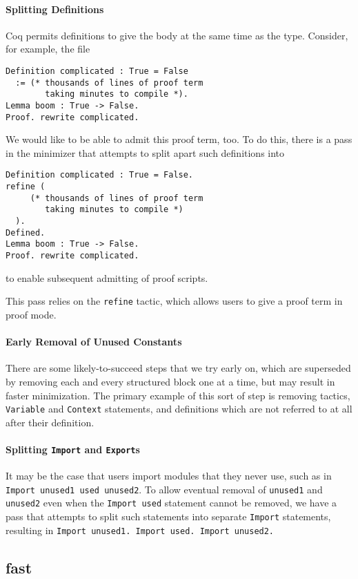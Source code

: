 \documentclass[a4paper,USenglish,cleveref,autoref,thm-restate]{lipics-v2021}
\begin{document}
\begin{enumerate}
\begin{enumerate}
\paragraph{Splitting Definitions}
Coq permits definitions to give the body at the same time as the type.
Consider, for example, the file
\begin{verbatim}
Definition complicated : True = False
  := (* thousands of lines of proof term
        taking minutes to compile *).
Lemma boom : True -> False.
Proof. rewrite complicated.
\end{verbatim}
We would like to be able to admit this proof term, too.
To do this, there is a pass in the minimizer that attempts to split apart such definitions into
\begin{verbatim}
Definition complicated : True = False.
refine (
     (* thousands of lines of proof term
        taking minutes to compile *)
  ).
Defined.
Lemma boom : True -> False.
Proof. rewrite complicated.
\end{verbatim}
to enable subsequent admitting of proof scripts.

This pass relies on the \verb|refine| tactic, which allows users to give a proof term in proof mode.


\paragraph{Early Removal of Unused Constants}
There are some likely-to-succeed steps that we try early on, which are superseded by removing each and every structured block one at a time, but may result in faster minimization.
The primary example of this sort of step is removing tactics, \verb|Variable| and \verb|Context| statements, and definitions which are not referred to at all after their definition.

\paragraph{Splitting \texttt{Import} and \texttt{Export}s}
It may be the case that users import modules that they never use, such as in \texttt{Import unused1 used unused2}.
To allow eventual removal of \verb|unused1| and \verb|unused2| even when the \verb|Import used| statement cannot be removed, we have a pass that attempts to split such statements into separate \verb|Import| statements, resulting in \texttt{Import unused1. Import used. Import unused2.}

\subsection{fast}

\end{enumerate}
\end{enumerate}
\end{document}

